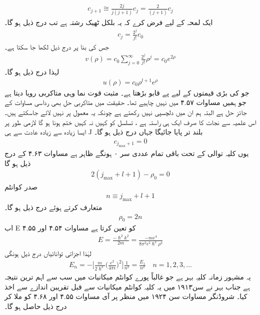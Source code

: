 \begin{align}
c_{j+1}\cong\frac{2j}{j(j+1)}c_{j}=\frac{2}{(j+1)}c_{j} 
\end{align}
ایک لمحہ کے لیے فرض کرے کہ یہ بلکل ٹھیک رشتہ ہے تب درج ذیل ہو گا۔
\begin{align}
c_{j}=\frac{2^{j}}{j!}c_{0} 
\end{align}
جس کی بنا پر درج ذیل لکھا جا سکتا ہے۔
\begin{align}
v(\rho)=c_{0}\sum_{j=0}^{\infty}\frac{2^{j}}{j!}\rho^{j}=c_{0}e^{2\rho} 
\end{align}
لہذا درج ذیل ہو گا۔
\begin{align}
u(\rho)=c_{0}\rho^{l+1}e^{\rho} 
\end{align}
 جو
 کی بڑی قیمتوں کے لیے پے قابو بڑھتا ہے۔ مثبت قوت نما وہی متاکربی رویا دیتا ہے جو ہمیں مساوات ۴.۵۷ میں نہیں چاہیے تھا۔ حقیقت میں متاکربی حل بھی رداسی مساوات کے جائز حل ہے البتہ ہم ان میں دلچسپی نہیں رکھتے ہے چونکہ یہ معمول پر نہیں لائے جاسکتے ہیں۔ اس علمیہ سے نجات کا صرف ایک ہی راستہ ہے ، تسلسل کو کہیں نہ کہیں ختم ہونا ہو گا لازمی طور پر ایسا زیادہ سے زیادہ عادت سے ہی J بلند تر پایا جائیگا جہاں درج ذیل ہو گا۔
 \begin{align}
c_{j_{\text{max}}+1}=0 
\end{align}
 یوں کلیہ توالی کے تحت باقی تمام عددی سر ۰ ہونگے ظاہر ہے مساوات ۴.۶۳ کے درج ذیل ہو گا
 \begin{align}
2(j_{\text{max}}+l+1)-\rho_{0}=0 
\end{align}
 صدر کوانٹم 
 \begin{align}
n\equiv j_{\text{max}}+l+1 
\end{align}
 متعارف کرتے ہوئے درج ذیل ہو گا۔
 \begin{align}
\rho_{0}=2n 
\end{align}
 اب E کو 
 تعین کرتا ہے مساوات ۴.۵۴ اور ۴.۵۵
 \begin{align}
E=\frac{-\hslash^{2}k^{2}}{2m}=\frac{-me^{4}}{8\pi^{2}\epsilon^{2}\hslash^{2}\rho^{2}} 
\end{align}
 لہٰذا اجزاتی توانائیاں درج ذیل ہونگی 
 \begin{align}
\boxed{E_{n}=-\big[\frac{m}{2\hslash^{2}}\big(\frac{e^{2}}{4\pi\epsilon}\big)^{2}\big]\frac{1}{n^{2}}=\frac{E_{1}}{n^{2}}\quad n=1,2,3,\dotsc} 
\end{align}
 یہ مشہور زمانہ کلیہِ بہر ہے جو غالباً پورے کوانٹم میکانیات میں  سب سے اہم ترین نتیجہ ہے جناب بہر نے سن۱۹۱۳ میں یہ کلیہ کوانٹم میکانیات سے قبل تقریبن اندازے سے اخذ کیا۔ شروڈنگر مساوات سن ۱۹۲۴ میں منظر پر آی مساوات  ۴.۵۵ اور ۴.۶۸ کو ملا کر درج ذیل حاصل ہو گا۔
